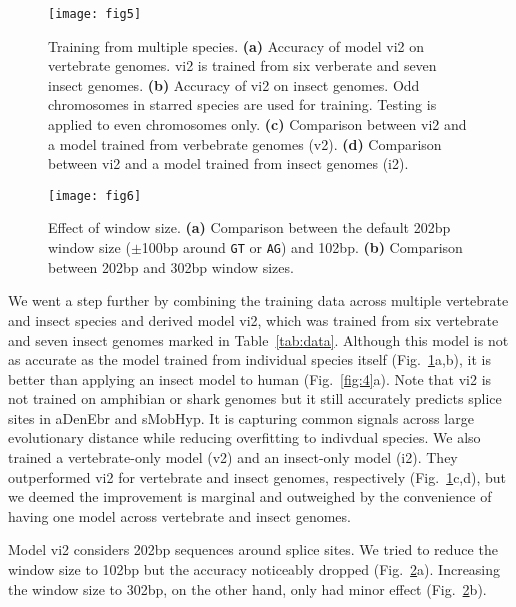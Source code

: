 \documentclass[webpdf,contemporary,large,namedate]{oup-authoring-template}%
\begin{document}
\begin{figure}[tb]
\texttt{[image: fig5]}
\caption{Training from multiple species.
{\bf (a)} Accuracy of model vi2 on vertebrate genomes. vi2 is trained from six verberate and seven insect genomes.
{\bf (b)} Accuracy of vi2 on insect genomes. Odd chromosomes in starred species are used for training.
Testing is applied to even chromosomes only.
{\bf (c)} Comparison between vi2 and a model trained from verbebrate genomes (v2).
{\bf (d)} Comparison between vi2 and a model trained from insect genomes (i2).}\label{fig:5}
\end{figure}

\begin{figure}[bt]
\texttt{[image: fig6]}
\caption{Effect of window size.
{\bf (a)} Comparison between the default 202bp window size ($\pm$100bp around {\tt GT} or {\tt AG}) and 102bp.
{\bf (b)} Comparison between 202bp and 302bp window sizes.}\label{fig:6}
\end{figure}

We went a step further by combining the training data across multiple vertebrate and insect species
and derived model vi2, which was trained from six vertebrate and seven insect genomes marked in Table~\ref{tab:data}.
Although this model is not as accurate as the model trained from individual species itself (Fig.~\ref{fig:5}a,b),
it is better than applying an insect model to human (Fig.~\ref{fig:4}a).
Note that vi2 is not trained on amphibian or shark genomes but it still accurately predicts splice sites in aDenEbr and sMobHyp.
It is capturing common signals across large evolutionary distance while reducing overfitting to indivdual species.
We also trained a vertebrate-only model (v2) and an insect-only model (i2).
They outperformed vi2 for vertebrate and insect genomes, respectively (Fig.~\ref{fig:5}c,d),
but we deemed the improvement is marginal and outweighed by the convenience
of having one model across vertebrate and insect genomes.

Model vi2 considers 202bp sequences around splice sites.
We tried to reduce the window size to 102bp but the accuracy noticeably dropped (Fig.~\ref{fig:6}a).
Increasing the window size to 302bp, on the other hand, only had minor effect (Fig.~\ref{fig:6}b).
\end{document}
